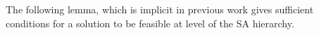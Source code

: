 \documentclass[11pt]{article}
\newcommand{\cfl}{{\sc Cfl}}
\begin{document}
\begin{comment}
The natural \cfl\ relaxation is defined as follows:




We will give the proof via the local-global method introduced in [Delavega-Mathieu], in 
which we interpret a linearized product of a set  variables namely  as the probability 
of occurring all the events   with respect to a distribution over integer solutions.
If there is  an assignment of values to the linearized variables such that in any set of variables appearing in a constraint obtained
after  level of SA (before the projection step) there is a distribution over some integer solutions and the values of the  variables coincide with the probability of the event
 with respect to that distribution, then the initial solution which corresponds to the projection of the "lifted solution" on the  variables survives  rounds.
 
The difficult part of the above method is to device a proper set of distributions. We use a novel
approach: for each such set we define a solution which are consistent on the variables of our
initial bad solution that appear in a lifted constraint and furthermore it has some desired properties
it satisfies some non-valid inequalities. Then we prove that the latter solution survives 
rounds of lifting in the mixed LS hierarchy applied to the initial relaxation with the addition of
those constraints. Thus the solution is a convex combination of integer solutions satisfying 
the particular set of constraints, a fact that we will exploit in proving the consistency of those 
distributions (for "consistency" see lemma below).

We note that proving that a particular solution survives  rounds of mixed LS circumvents
the difficulty of explicitly defining a distribution e.g. via the analysis of a randomized construction
like the one in [Delavega-Mathieu]. For our proof we consider the underlying distributions abstractly - we make use some of their properties.
\end{comment}

The following lemma, which is implicit in previous work
\cite{FernandezdlVKM07,GeorgiouMagen} 
 gives sufficient conditions for a solution to be feasible at  level  of the SA hierarchy.
\end{document}
